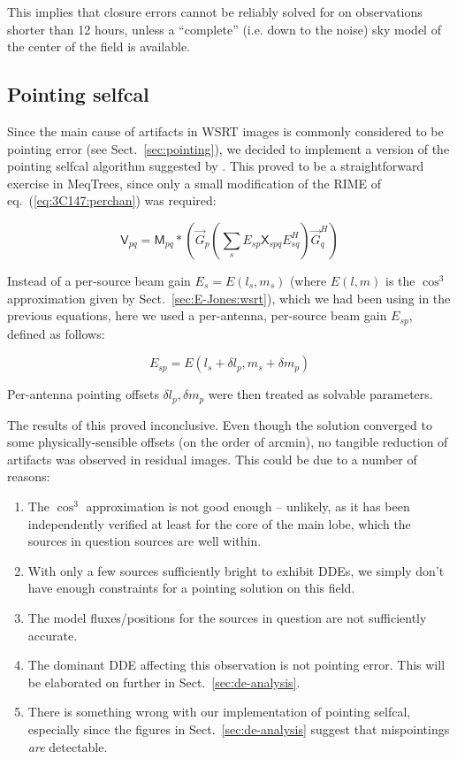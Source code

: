\documentclass[]{aa}
\newcommand{\herm}{H}
\newcommand{\jones}[2]{\vec {#1}_{#2}}
\newcommand{\jonesT}[2]{\vec {#1}^{\herm}_{#2}}
\newcommand{\coh}[2]{\mathsf{{#1}}_{{#2}}}
\begin{document}
This implies that closure errors cannot be reliably solved for on observations shorter than 12 hours, unless a ``complete'' (i.e. down to the noise) sky model of the center of the field is available.

\subsection{Pointing selfcal\label{sec:3C147:pointing}}

Since the main cause of artifacts in WSRT images is commonly considered to be pointing error (see Sect.~\ref{sec:pointing}), we decided to implement a version of the pointing selfcal algorithm suggested by \citet{SB:pointing}. This proved to be a straightforward exercise in MeqTrees, since only a small modification of the RIME of eq.~(\ref{eq:3C147:perchan}) was required: 

\begin{equation}\label{eq:3C147:pointing}
\coh{V}{pq} = \coh{M}{pq} \ast \left ( \jones{G}{p} \left( \sum_s E_{sp} \coh{X}{spq} E^{\herm}_{sq} \right) \jonesT{G}{q} \right )
\end{equation}

Instead of a per-source beam gain $E_s=E(l_s,m_s)$ (where $E(l,m)$ is the $\cos^3$ approximation given by Sect.~\ref{sec:E-Jones:wsrt}), which we had been using in the previous equations, here we used a per-antenna, per-source beam gain $E_{sp}$, defined as follows:

\begin{equation}\label{eq:3C147:offset-beam}
E_{sp} = E(l_s+\delta l_p,m_s+\delta m_p)
\end{equation}

Per-antenna pointing offsets $\delta l_p,\delta m_p$ were then treated as solvable parameters. 

The results of this proved inconclusive. Even though the solution converged to some physically-sensible offsets (on the order of arcmin), no tangible reduction of artifacts was observed in residual images. This could be due to a number of reasons:

\begin{enumerate}
\item The $\cos^3$ approximation is not good enough -- unlikely, as it has been independently verified at least for the core of the main lobe, which the sources in question sources are well within.
\item With only a few sources sufficiently bright to exhibit DDEs, we simply don't have enough constraints for a pointing solution on this field.
\item The model fluxes/positions for the sources in question are not sufficiently accurate.
\item The dominant DDE affecting this observation is not pointing error. This will be elaborated on further in Sect.~\ref{sec:de-analysis}. 
\item There is something wrong with our implementation of pointing selfcal, especially since the figures in Sect.~\ref{sec:de-analysis} suggest that mispointings \emph{are} detectable.
\end{enumerate}
\end{document}
